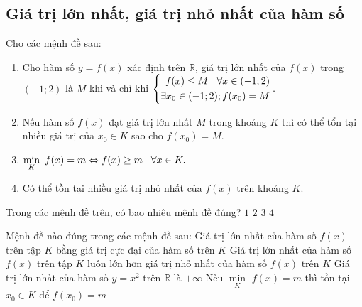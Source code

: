 \subsection{Giá trị lớn nhất, giá trị nhỏ nhất của hàm số}
\begin{ex}%
	Cho các mệnh đề sau:
	\begin{enumerate}
		\item Cho hàm số $y=f(x)$ xác định trên $\mathbb{R}$, giá trị lớn nhất của $f(x)$ trong $(-1;2)$ là $M$ khi và chỉ khi $ \left\{\begin{aligned}f(x) \le M \hspace{0.3cm} \forall x \in (-1;2) \\ \exists x_0 \in (-1;2); f(x_0)=M\end{aligned}\right..$
		\item Nếu hàm số $f(x)$ đạt giá trị lớn nhất $M$ trong khoảng $K$ thì có thể tổn tại nhiều giá trị của $x_0 \in K$ sao cho $f(x_0)=M.$
		\item $\mathop {\min }\limits_{K} \,\,f(x) = m \Leftrightarrow f(x) \ge m \hspace{0.3cm} \forall x \in K.$
		\item Có thể tồn tại nhiều giá trị nhỏ nhất của $f(x)$ trên khoảng $K$.  
	\end{enumerate}
	Trong các mệnh đề trên, có bao nhiêu mệnh đề đúng?
	\choice
	{$1$}
	{\True $2$}
	{$3$}
	{$4$}
\end{ex}
\begin{ex}%
	Mệnh đề nào đúng trong các mệnh đề sau:
	\choice
	{Giá trị lớn nhất của hàm số $f(x)$ trên tập $K$ bằng giá trị cực đại của hàm số trên $K$}
	{Giá trị lớn nhất của hàm số $f(x)$ trên tập $K$ luôn lớn hơn giá trị nhỏ nhất của hàm số $f(x)$ trên $K$}
	{Giá trị lớn nhất của hàm số $y=x^2$ trên $\mathbb{R}$ là $+\infty$}
	{\True Nếu $\mathop {\min }\limits_{K} \,\,f(x) = m$ thì tồn tại $x_0 \in K$ để $f(x_0)=m$}
\end{ex}

